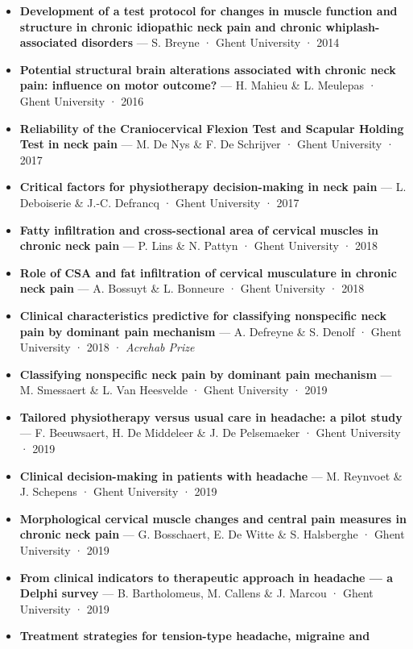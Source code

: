 \documentclass[
  letterpaper,
  DIV=11,
  numbers=noendperiod]{scrartcl}
\providecommand{\tightlist}{%
  \setlength{\itemsep}{0pt}\setlength{\parskip}{0pt}}\usepackage{longtable,booktabs,array}
\begin{document}
\begin{itemize}
\tightlist
\item
  \textbf{Development of a test protocol for changes in muscle function
  and structure in chronic idiopathic neck pain and chronic
  whiplash-associated disorders} --- S. Breyne · Ghent University · 2014
\item
  \textbf{Potential structural brain alterations associated with chronic
  neck pain: influence on motor outcome?} --- H. Mahieu \& L. Meulepas ·
  Ghent University · 2016
\item
  \textbf{Reliability of the Craniocervical Flexion Test and Scapular
  Holding Test in neck pain} --- M. De Nys \& F. De Schrijver · Ghent
  University · 2017
\item
  \textbf{Critical factors for physiotherapy decision-making in neck
  pain} --- L. Deboiserie \& J.-C. Defrancq · Ghent University · 2017
\item
  \textbf{Fatty infiltration and cross-sectional area of cervical
  muscles in chronic neck pain} --- P. Lins \& N. Pattyn · Ghent
  University · 2018
\item
  \textbf{Role of CSA and fat infiltration of cervical musculature in
  chronic neck pain} --- A. Bossuyt \& L. Bonneure · Ghent University ·
  2018
\item
  \textbf{Clinical characteristics predictive for classifying
  nonspecific neck pain by dominant pain mechanism} --- A. Defreyne \&
  S. Denolf · Ghent University · 2018 · \emph{Acrehab Prize}
\item
  \textbf{Classifying nonspecific neck pain by dominant pain mechanism}
  --- M. Smessaert \& L. Van Heesvelde · Ghent University · 2019
\item
  \textbf{Tailored physiotherapy versus usual care in headache: a pilot
  study} --- F. Beeuwsaert, H. De Middeleer \& J. De Pelsemaeker · Ghent
  University · 2019
\item
  \textbf{Clinical decision-making in patients with headache} --- M.
  Reynvoet \& J. Schepens · Ghent University · 2019
\item
  \textbf{Morphological cervical muscle changes and central pain
  measures in chronic neck pain} --- G. Bosschaert, E. De Witte \& S.
  Halsberghe · Ghent University · 2019
\item
  \textbf{From clinical indicators to therapeutic approach in headache
  --- a Delphi survey} --- B. Bartholomeus, M. Callens \& J. Marcou ·
  Ghent University · 2019
\item
  \textbf{Treatment strategies for tension-type headache, migraine and
}
\end{itemize}
\end{document}
